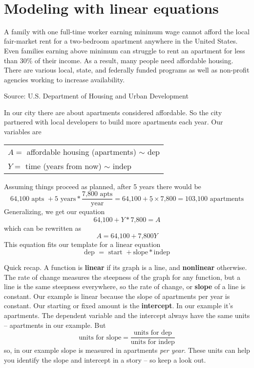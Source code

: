  ~\vspace{.1in}
 
\section{Modeling with linear equations}

A family with one full-time worker earning minimum wage cannot afford the local fair-market rent for a two-bedroom apartment anywhere in the United States.  
Even families earning above minimum can struggle to rent an apartment for less than 30\% of their income.  As a result, many people need affordable housing.  There are various local, state, and federally funded programs as well as non-profit agencies working to increase availability.

 \hfill \begin{footnotesize} Source:  U.S. Department of Housing and Urban Development \end{footnotesize} %

In our city there are about  apartments considered affordable.  So the city partnered with local developers to build  more apartments each year.    Our variables are
\begin{center}
\begin{tabular} {l} 
$A=$ affordable housing (apartments) $\sim$ dep \\
$Y=$ time (years from now) $\sim$ indep \\ 
\end{tabular}
\end{center}
Assuming things proceed as planned, after 5 years there would be 
$$\text{64,100 apts } + 5 \text{ years} \ast \frac{\text{7,800 apts}}{\text{year}}=\text{64,100}+\underline{5} \times \text{7,800} =  \text{103,100} \text{ apartments}$$
Generalizing, we get our equation $$\text{64,100}+Y\ast \text{7,800} =  A$$
which can be rewritten as $$A = \text{64,100} + \text{7,800}Y$$
This equation fits our template for a linear equation 
$$\text{dep }=\text{ start } + \text{slope} \ast {\text{indep}}$$

Quick recap.  A function is \textbf{linear} if its graph is a line, and \textbf{nonlinear} otherwise.  The rate of change measures the steepness of the graph for any function, but a line is the same steepness everywhere, so the rate of change, or \textbf{slope} of a line is constant.   Our example is linear because the slope of  apartments per year is constant.  Our starting or fixed amount is the \textbf{intercept}.  In our example it's   apartments.  The dependent variable and the intercept always have the same units -- apartments in our example.  But $$\text{units for slope} =\frac{\text{units for dep}}{\text{units for indep}}$$ so, in our example slope is measured in apartments \emph{per year}.
These units can help you identify the slope and intercept in a story -- so keep a look out.

